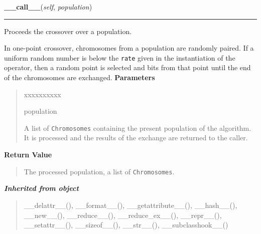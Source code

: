     \vspace{0.5ex}

\hspace{.8\funcindent}\begin{boxedminipage}{\funcwidth}

    \raggedright \textbf{\_\_call\_\_}(\textit{self}, \textit{population})

    \vspace{-1.5ex}

    \rule{\textwidth}{0.5\fboxrule}
\setlength{\parskip}{2ex}

Proceeds the crossover over a population.

In one-point crossover, chromosomes from a population are randomly
paired. If a uniform random number is below the \texttt{rate} given in the
instantiation of the operator, then a random point is selected and bits
from that point until the end of the chromosomes are exchanged.
\setlength{\parskip}{1ex}
      \textbf{Parameters}
      \vspace{-1ex}

      \begin{quote}
        \begin{Ventry}{xxxxxxxxxx}

          \item[population]


A list of \texttt{Chromosomes} containing the present population of the
algorithm. It is processed and the results of the exchange are
returned to the caller.
        \end{Ventry}

      \end{quote}

      \textbf{Return Value}
    \vspace{-1ex}

      \begin{quote}

The processed population, a list of \texttt{Chromosomes}.
      \end{quote}

    \end{boxedminipage}


\large{\textbf{\textit{Inherited from object}}}

\begin{quote}
\_\_delattr\_\_(), \_\_format\_\_(), \_\_getattribute\_\_(), \_\_hash\_\_(), \_\_new\_\_(), \_\_reduce\_\_(), \_\_reduce\_ex\_\_(), \_\_repr\_\_(), \_\_setattr\_\_(), \_\_sizeof\_\_(), \_\_str\_\_(), \_\_subclasshook\_\_()
\end{quote}

